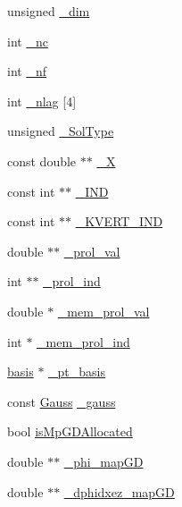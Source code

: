 \begin{DoxyCompactItemize}
\item 
unsigned \mbox{\hyperlink{classfemus_1_1elem__type_a71ea0da630a7830c3278d58243da0ead}{\+\_\+dim}}
\item 
int \mbox{\hyperlink{classfemus_1_1elem__type_aeaf5fcedea91ceb9894f5a385eebddab}{\+\_\+nc}}
\item 
int \mbox{\hyperlink{classfemus_1_1elem__type_aaa24556879d31c619c0258062c77276b}{\+\_\+nf}}
\item 
int \mbox{\hyperlink{classfemus_1_1elem__type_a7ffed37a1c710167fc1aed224cce45f4}{\+\_\+nlag}} \mbox{[}4\mbox{]}
\item 
unsigned \mbox{\hyperlink{classfemus_1_1elem__type_a3278ebbdc41e6e7c03aea23995220dab}{\+\_\+\+Sol\+Type}}
\item 
const double $\ast$$\ast$ \mbox{\hyperlink{classfemus_1_1elem__type_aa69848a2a5365dc3647b8b0f756a6ec0}{\+\_\+X}}
\item 
const int $\ast$$\ast$ \mbox{\hyperlink{classfemus_1_1elem__type_ab6163fc83bbd668366744f1d1cc405ca}{\+\_\+\+I\+ND}}
\item 
const int $\ast$$\ast$ \mbox{\hyperlink{classfemus_1_1elem__type_a22d10410085b36b93db138252d6860b9}{\+\_\+\+K\+V\+E\+R\+T\+\_\+\+I\+ND}}
\item 
double $\ast$$\ast$ \mbox{\hyperlink{classfemus_1_1elem__type_aca81317b1dfdf99cb82d6c47c7906534}{\+\_\+prol\+\_\+val}}
\item 
int $\ast$$\ast$ \mbox{\hyperlink{classfemus_1_1elem__type_a51686b913b9626125f58feea7c7ca5da}{\+\_\+prol\+\_\+ind}}
\item 
double $\ast$ \mbox{\hyperlink{classfemus_1_1elem__type_ab99cb41fdebab468d2ae484fe8a65edd}{\+\_\+mem\+\_\+prol\+\_\+val}}
\item 
int $\ast$ \mbox{\hyperlink{classfemus_1_1elem__type_a7c4de3964da26762c3c500d7311fc23b}{\+\_\+mem\+\_\+prol\+\_\+ind}}
\item 
\mbox{\hyperlink{classfemus_1_1basis}{basis}} $\ast$ \mbox{\hyperlink{classfemus_1_1elem__type_a74ff85a1f6d5439f08c25d4d0321c609}{\+\_\+pt\+\_\+basis}}
\item 
const \mbox{\hyperlink{classfemus_1_1_gauss}{Gauss}} \mbox{\hyperlink{classfemus_1_1elem__type_a4c14f3f54d9317b57f2effd2519e45b9}{\+\_\+gauss}}
\item 
bool \mbox{\hyperlink{classfemus_1_1elem__type_a57a7738e4179b9ca205db7e3c18898af}{is\+Mp\+G\+D\+Allocated}}
\item 
double $\ast$$\ast$ \mbox{\hyperlink{classfemus_1_1elem__type_a54e9c728b24b46b7cfe7163caf8f44ba}{\+\_\+phi\+\_\+map\+GD}}
\item 
double $\ast$$\ast$ \mbox{\hyperlink{classfemus_1_1elem__type_a631bc33eb5635fe19fa879246cfde2a2}{\+\_\+dphidxez\+\_\+map\+GD}}
\end{DoxyCompactItemize}


